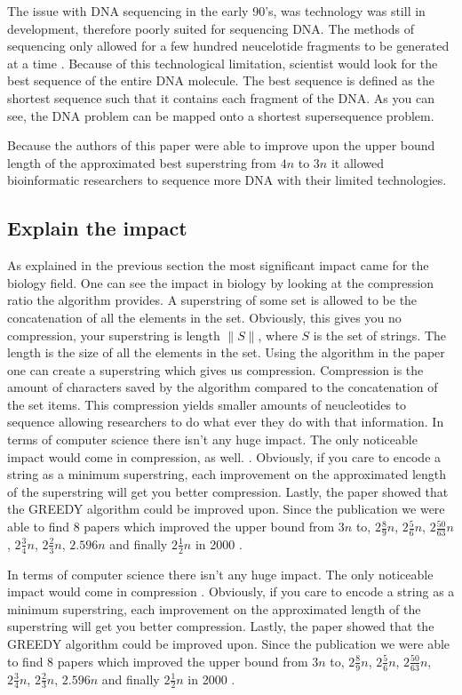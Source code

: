 \documentclass[letterpaper,11pt,titlepage]{article}
\begin{document}
The issue with DNA sequencing in the early 90's, was technology was still in development, therefore poorly suited for sequencing DNA. The methods of sequencing only allowed for a few hundred neucelotide fragments to be generated at a time \cite{karp1993mapping}. Because of this technological limitation, scientist would look for the best sequence of the entire DNA molecule. The best sequence is defined as the shortest sequence such that it contains each fragment of the DNA. As you can see, the DNA problem can be mapped onto a shortest supersequence problem. 

Because the authors of this paper were able to improve upon the upper bound length of the approximated best superstring from $4n$ to $3n$ it allowed bioinformatic researchers to sequence more DNA with their limited technologies. 




\subsection*{Explain the impact}
As explained in the previous section the most significant impact came for the biology field. One can see the impact in biology by looking at the compression ratio the algorithm provides. A superstring of some set is allowed to be the concatenation of all the elements in the set. Obviously, this gives you no compression, your superstring is length $\| S \|$, where $S$ is the set of strings. The length is the size of all the elements in the set. Using the algorithm in the paper one can create a superstring which gives us compression. Compression is the amount of characters saved by the algorithm compared to the concatenation of the set items. This compression yields smaller amounts of neucleotides to sequence allowing researchers to do what ever they do with that information.  In terms of computer science there isn't any huge impact.  The only noticeable impact would come in compression, as well. \cite{storer1988data}. Obviously, if you care to encode a string as a minimum superstring, each improvement on the approximated length of the superstring will get you better compression. Lastly, the paper showed that the GREEDY algorithm could be improved upon. Since the publication we were able to find 8 papers which improved the upper bound from $3n$ to, $2 \frac{8}{9}n$, $2 \frac{5}{6}n$, $2 \frac{50}{63}n$, $2 \frac{3}{4}n$, $2 \frac{2}{3}n$, $2.596n$ and finally $2 \frac{1}{2}n$ in 2000 \cite{sweedyk2000boldmath}.

In terms of computer science there isn't any huge impact.  The only noticeable impact would come in compression \cite{storer1988data}. Obviously, if you care to encode a string as a minimum superstring, each improvement on the approximated length of the superstring will get you better compression. Lastly, the paper showed that the GREEDY algorithm could be improved upon. Since the publication we were able to find 8 papers which improved the upper bound from $3n$ to, $2 \frac{8}{9}n$, $2 \frac{5}{6}n$, $2 \frac{50}{63}n$, $2 \frac{3}{4}n$, $2 \frac{2}{3}n$, $2.596n$ and finally $2 \frac{1}{2}n$ in 2000 \cite{sweedyk2000boldmath}.
\end{document}

